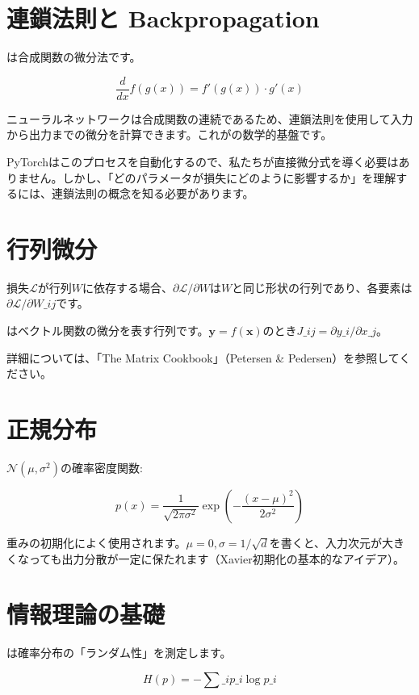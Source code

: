 \section{連鎖法則と Backpropagation}

は合成関数の微分法です。

\[
\frac{d}{dx} f(g(x)) = f'(g(x)) \cdot g'(x)
\]

ニューラルネットワークは合成関数の連続であるため、連鎖法則を使用して入力から出力までの微分を計算できます。これがの数学的基盤です。

PyTorchはこのプロセスを自動化するので、私たちが直接微分式を導く必要はありません。しかし、「どのパラメータが損失にどのように影響するか」を理解するには、連鎖法則の概念を知る必要があります。

\section{行列微分}

損失$\mathcal{L}$が行列$W$に依存する場合、$\partial \mathcal{L} / \partial W$は$W$と同じ形状の行列であり、各要素は$\partial \mathcal{L} / \partial W\_{ij}$です。

はベクトル関数の微分を表す行列です。$\mathbf{y} = f(\mathbf{x})$のとき$J\_{ij} = \partial y\_i / \partial x\_j$。

詳細については、「The Matrix Cookbook」（Petersen \& Pedersen）を参照してください。

\section{正規分布}

$\mathcal{N}(\mu, \sigma^2)$の確率密度関数:

\[
p(x) = \frac{1}{\sqrt{2\pi\sigma^2}} \exp\left(-\frac{(x-\mu)^2}{2\sigma^2}\right)
\]

重みの初期化によく使用されます。$\mu=0, \sigma = 1/\sqrt{d}$を書くと、入力次元が大きくなっても出力分散が一定に保たれます（Xavier初期化の基本的なアイデア）。

\section{情報理論の基礎}

は確率分布の「ランダム性」を測定します。

\[
H(p) = -\sum\_i p\_i \log p\_i
\]

